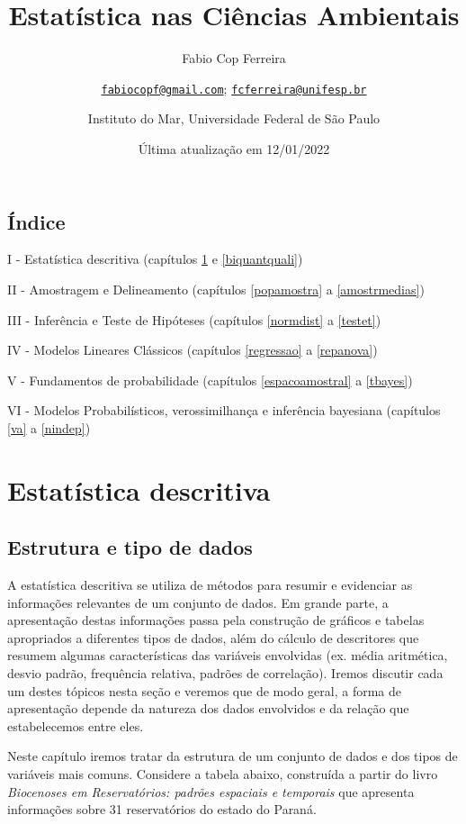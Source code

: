 \documentclass[
]{book}
\title{Estatística nas Ciências Ambientais}
\author{Fabio Cop Ferreira \and \href{mailto:fabiocopf@gmail.com}{\nolinkurl{fabiocopf@gmail.com}}; \href{mailto:fcferreira@unifesp.br}{\nolinkurl{fcferreira@unifesp.br}} \and Instituto do Mar, Universidade Federal de São Paulo}
\date{Última atualização em 12/01/2022}
\begin{document}
\maketitle

{
\setcounter{tocdepth}{1}
\tableofcontents
}
\hypertarget{uxedndice}{%
\chapter*{Índice}\label{uxedndice}}

I - Estatística descritiva (capítulos \ref{estrdados} e \ref{biquantquali})

II - Amostragem e Delineamento (capítulos \ref{popamostra} a \ref{amostrmedias})

III - Inferência e Teste de Hipóteses (capítulos \ref{normdist} a \ref{testet})

IV - Modelos Lineares Clássicos (capítulos \ref{regressao} a \ref{repanova})

V - Fundamentos de probabilidade (capítulos \ref{espacoamostral} a \ref{tbayes})

VI - Modelos Probabilísticos, verossimilhança e inferência bayesiana (capítulos \ref{va} a \ref{nindep})

\hypertarget{part-estatuxedstica-descritiva}{%
\part{Estatística descritiva}\label{part-estatuxedstica-descritiva}}

\hypertarget{estrdados}{%
\chapter{Estrutura e tipo de dados}\label{estrdados}}

A estatística descritiva se utiliza de métodos para resumir e evidenciar as informações relevantes de um conjunto de dados. Em grande parte, a apresentação destas informações passa pela construção de gráficos e tabelas apropriados a diferentes tipos de dados, além do cálculo de descritores que resumem algumas características das variáveis envolvidas (ex. média aritmética, desvio padrão, frequência relativa, padrões de correlação). Iremos discutir cada um destes tópicos nesta seção e veremos que de modo geral, a forma de apresentação depende da natureza dos dados envolvidos e da relação que estabelecemos entre eles.

Neste capítulo iremos tratar da estrutura de um conjunto de dados e dos tipos de variáveis mais comuns. Considere a tabela abaixo, construída a partir do livro \emph{Biocenoses em Reservatórios: padrões espaciais e temporais} \citep{rodriguesetal2005} que apresenta informações sobre 31 reservatórios do estado do Paraná.
\end{document}
